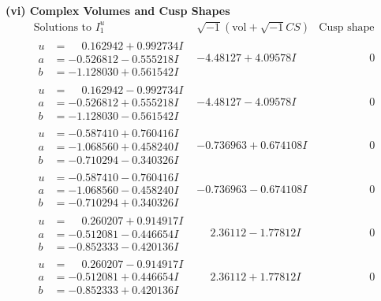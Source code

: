 \documentclass[1p]{elsarticle_modified}
\theoremstyle{definition}
\newcommand{\I}{\sqrt{-1}}
\begin{document}
\newpage\flushleft \textbf{(vi) Complex Volumes and Cusp Shapes}
$$\begin{array}{c|c|c}  
\text{Solutions to }I^u_{1}& \I (\text{vol} + \sqrt{-1}CS) & \text{Cusp shape}\\
 \hline 
\begin{aligned}
u &= \phantom{-}0.162942 + 0.992734 I \\
a &= -0.526812 - 0.555218 I \\
b &= -1.128030 + 0.561542 I\end{aligned}
 & -4.48127 + 4.09578 I & \phantom{-0.000000 } 0 \\ \hline\begin{aligned}
u &= \phantom{-}0.162942 - 0.992734 I \\
a &= -0.526812 + 0.555218 I \\
b &= -1.128030 - 0.561542 I\end{aligned}
 & -4.48127 - 4.09578 I & \phantom{-0.000000 } 0 \\ \hline\begin{aligned}
u &= -0.587410 + 0.760416 I \\
a &= -1.068560 + 0.458240 I \\
b &= -0.710294 - 0.340326 I\end{aligned}
 & -0.736963 + 0.674108 I & \phantom{-0.000000 } 0 \\ \hline\begin{aligned}
u &= -0.587410 - 0.760416 I \\
a &= -1.068560 - 0.458240 I \\
b &= -0.710294 + 0.340326 I\end{aligned}
 & -0.736963 - 0.674108 I & \phantom{-0.000000 } 0 \\ \hline\begin{aligned}
u &= \phantom{-}0.260207 + 0.914917 I \\
a &= -0.512081 - 0.446654 I \\
b &= -0.852333 - 0.420136 I\end{aligned}
 & \phantom{-}2.36112 - 1.77812 I & \phantom{-0.000000 } 0 \\ \hline\begin{aligned}
u &= \phantom{-}0.260207 - 0.914917 I \\
a &= -0.512081 + 0.446654 I \\
b &= -0.852333 + 0.420136 I\end{aligned}
 & \phantom{-}2.36112 + 1.77812 I & \phantom{-0.000000 } 0 \\ \hline\begin{aligned}

\end{aligned}
\end{array}$$
\end{document}
